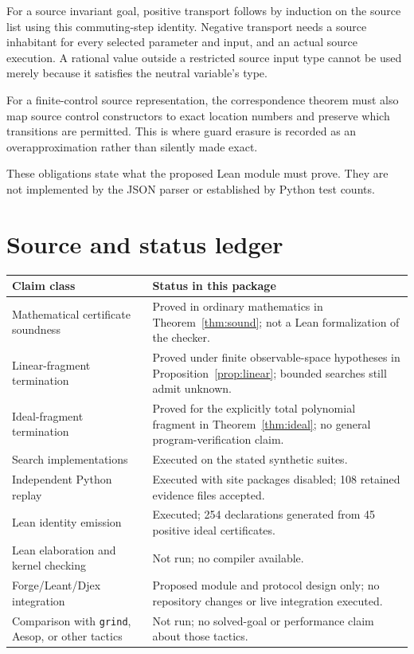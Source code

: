 \documentclass[11pt,letterpaper]{article}
\theoremstyle{definition}
\newcommand{\code}[1]{\nolinkurl{#1}}
\begin{document}
For a source invariant goal, positive transport follows by induction on the
source list using this commuting-step identity. Negative transport needs a
source inhabitant for every selected parameter and input, and an actual source
execution. A rational value outside a restricted source input type cannot be
used merely because it satisfies the neutral variable's type.

For a finite-control source representation, the correspondence theorem must
also map source control constructors to exact location numbers and preserve
which transitions are permitted. This is where guard erasure is recorded as
an overapproximation rather than silently made exact.

These obligations state what the proposed Lean module must prove. They are not
implemented by the JSON parser or established by Python test counts.

\section{Source and status ledger}

\begin{longtable}{@{}p{.30\linewidth}p{.63\linewidth}@{}}
\toprule
Claim class & Status in this package\\
\midrule\endhead
Mathematical certificate soundness & Proved in ordinary mathematics in
Theorem~\ref{thm:sound}; not a Lean formalization of the checker.\\[.5em]
Linear-fragment termination & Proved under finite observable-space hypotheses
in Proposition~\ref{prop:linear}; bounded searches still admit unknown.\\[.5em]
Ideal-fragment termination & Proved for the explicitly total polynomial fragment
in Theorem~\ref{thm:ideal}; no general program-verification claim.\\[.5em]
Search implementations & Executed on the stated synthetic suites.\\[.5em]
Independent Python replay & Executed with site packages disabled; 108 retained
evidence files accepted.\\[.5em]
Lean identity emission & Executed; 254 declarations generated from 45 positive
ideal certificates.\\[.5em]
Lean elaboration and kernel checking & Not run; no compiler available.\\[.5em]
Forge/Leant/Djex integration & Proposed module and protocol design only; no
repository changes or live integration executed.\\[.5em]
Comparison with \code{grind}, Aesop, or other tactics & Not run; no solved-goal
or performance claim about those tactics.\\
\bottomrule
\end{longtable}
\end{document}
